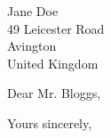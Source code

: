 \documentclass{londonletter}
\begin{document}
\raggedbottom

\begin{letter}{
    Jane Doe\\
    49 Leicester Road \\
    Avington \\
    United Kingdom
}
    \cvheader
    \bigskip

    \opening{Dear Mr. Bloggs,}
        \lipsum[1-3]
    \closing{Yours sincerely,}
\end{letter}
\end{document}
